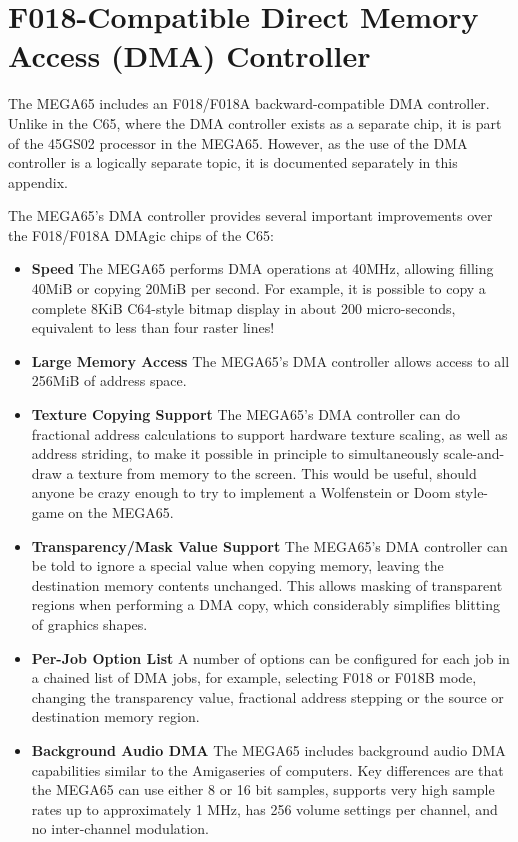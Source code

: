 \chapter{F018-Compatible Direct Memory Access (DMA) Controller}
\label{cha:dmagic}

The MEGA65 includes an F018/F018A backward-compatible DMA controller.
Unlike in the C65, where the DMA controller exists as a separate
chip, it is part of the 45GS02 processor in the MEGA65.  However, as the
use of the DMA controller is a logically separate topic, it is documented
separately in this appendix.

The MEGA65's DMA controller provides several important improvements over the
F018/F018A DMAgic chips of the C65:

\begin{itemize}
\item{\bf Speed} The MEGA65 performs DMA operations at 40MHz, allowing filling 40MiB or copying 20MiB
  per second.  For example, it is possible to copy a complete 8KiB C64-style bitmap display in
  about 200 micro-seconds, equivalent to less than four raster lines!
 \item{\bf Large Memory Access} The MEGA65's DMA controller allows access to all 256MiB of address space.
\item{\bf Texture Copying Support} The MEGA65's DMA controller can do fractional address calculations
  to support hardware texture scaling, as well as address striding, to make it possible in principle
  to simultaneously scale-and-draw a texture from memory to the screen. This would be useful, should
  anyone be crazy enough to try to implement a Wolfenstein or Doom style-game on the MEGA65.
\item{\bf Transparency/Mask Value Support} The MEGA65's DMA controller can be told to ignore a special value
   when copying memory, leaving the destination memory contents unchanged. This allows masking of transparent
   regions when performing a DMA copy, which considerably simplifies blitting of graphics shapes.
\item{\bf Per-Job Option List} A number of options can be configured for each job in a chained list of DMA
  jobs, for example, selecting F018 or F018B mode, changing the transparency value, fractional address stepping
  or the source or destination memory region.

\item{\bf Background Audio DMA}
  The MEGA65 includes background audio DMA capabilities similar to the Amiga\texttrademark series of computers.
  Key differences are that the MEGA65 can use either 8 or 16 bit samples, supports very high sample rates
  up to approximately 1 MHz, has 256 volume settings per channel, and no inter-channel modulation.

\end{itemize}


